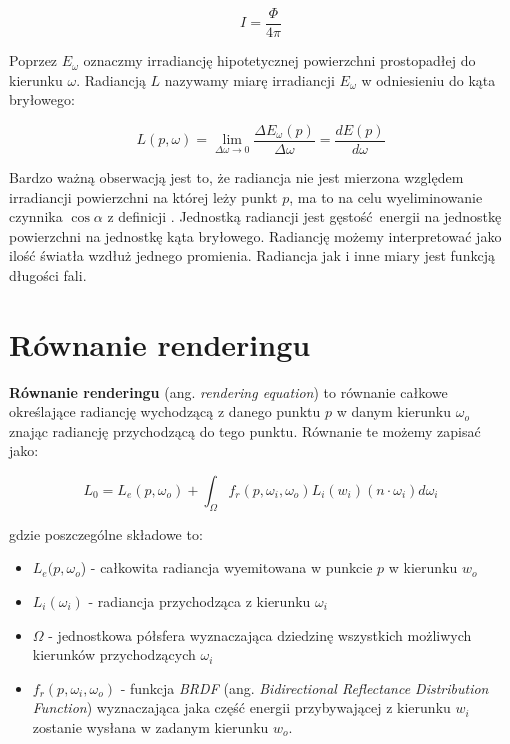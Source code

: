 \documentclass[../main.tex]{subfiles}
\begin{document}
\[
  I = \frac{\Phi}{4\pi}
\]

Poprzez $E_{\omega}$ oznaczmy irradiancję hipotetycznej powierzchni
prostopadłej do kierunku $\omega$. Radiancją $L$ nazywamy miarę irradiancji
$E_{\omega}$ w odniesieniu do kąta bryłowego:

$$
L(p, \omega) = \lim_{\Delta\omega \rightarrow 0} {
  \frac{\Delta E_{\omega} (p)}{\Delta\omega}
} =
\frac{d E(p)}{d \omega}
$$

Bardzo ważną obserwacją jest to, że radiancja nie jest mierzona względem
irradiancji powierzchni na której leży punkt $p$, ma to na celu wyeliminowanie
czynnika $\cos \alpha$ z definicji \cite[p. 339]{pbrt}. Jednostką radiancji
jest gęstość energii na jednostkę powierzchni na jednostkę kąta bryłowego.
Radiancję możemy interpretować jako ilość światła wzdłuż jednego promienia.
Radiancja jak i inne miary jest funkcją długości fali.

\section{Równanie renderingu}

\textbf{Równanie renderingu} (ang. \textit{rendering equation}) to równanie
całkowe określające radiancję wychodzącą z danego punktu $p$ w danym kierunku
$\omega_o$ znając radiancję przychodzącą do tego punktu. Równanie te możemy
zapisać jako:

\[
  L_0 =
  L_{e}(p, \omega_o) +
  \int_{\Omega} {
    f_r(p, \omega_i, \omega_o)
    L_i(w_i)
    (n \cdot \omega_i)
    d \omega_i
  }
\]

\noindent gdzie poszczególne składowe to:

\begin{itemize}

  \item $L_e(p, \omega_o$) - całkowita radiancja wyemitowana  w punkcie $p$ w
    kierunku $w_o$

  \item $L_i(\omega_i)$ - radiancja przychodząca z kierunku $\omega_i$

  \item $\Omega$ - jednostkowa półsfera wyznaczająca dziedzinę wszystkich
    możliwych kierunków przychodzących $\omega_i$

  \item $f_{r}(p, \omega_i, \omega_o)$ - funkcja \textit{BRDF} (ang.
    \textit{Bidirectional Reflectance Distribution Function}) wyznaczająca jaka
    część energii przybywającej z kierunku $w_i$ zostanie wysłana w zadanym
    kierunku $w_o$.

\end{itemize}
\end{document}
